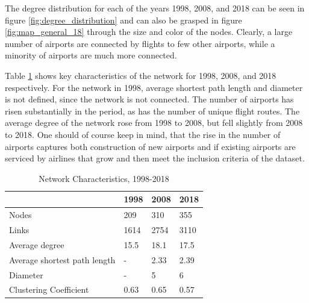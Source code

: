 The degree distribution for each of the years 1998, 2008, and 2018 can be seen in figure \ref{fig:degree_distribution} and can also be grasped in figure \ref{fig:map_general_18} through the size and color of the nodes. Clearly, a large number of airports are connected by flights to few other airports, while a minority of airports are much more connected.
\par
Table \ref{tab: temporal} shows key characteristics of the network for 1998, 2008, and 2018 respectively. For the network in 1998, average shortest path length and diameter is not defined, since the network is not connected. The number of airports has risen substantially in the period, as has the number of unique flight routes. The average degree of the network rose from 1998 to 2008, but fell slightly from 2008 to 2018. One should of course keep in mind, that the rise in the number of airports captures both construction of new airports and if existing airports are serviced by airlines that grow and then meet the inclusion criteria of the dataset. 
\begin{table}[H]
\centering 
\caption{Network Characteristics, 1998-2018}
\label{tab: temporal}
\begin{tabular}{|l|l|l|l|}
\hline
\textbf{}                    & \textbf{1998} & \textbf{2008} & \textbf{2018} \\ \hline
Nodes                        & 209           & 310           & 355           \\
Links                        & 1614          & 2754          & 3110          \\
Average degree               & 15.5         & 18.1         & 17.5          \\
Average shortest path length & -           & 2.33          & 2.39          \\ 
Diameter                     & -             & 5             & 6           \\
Clustering Coefficient       & 0.63          & 0.65          & 0.57          \\ \hline
\end{tabular}
\end{table}
\noindent
